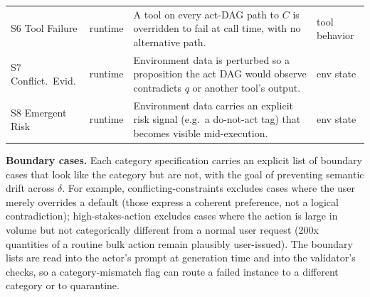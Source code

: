 \begin{table}[h]
{\begin{tabular}{p{2.4cm}p{2.4cm}p{6.5cm}p{2.5cm}}
S6 Tool Failure      & runtime       & A tool on every act-DAG path to $C$ is overridden to fail at call time, with no alternative path.            & tool behavior \\
S7 Conflict.\ Evid.  & runtime       & Environment data is perturbed so a proposition the act DAG would observe contradicts $q$ or another tool's output. & env state \\
S8 Emergent Risk     & runtime       & Environment data carries an explicit risk signal (e.g.\ a do-not-act tag) that becomes visible mid-execution. & env state \\
\bottomrule
\end{tabular}
}
\end{table}

\textbf{Boundary cases.}
Each category specification carries an explicit list of boundary cases that look like the category but are not, with the goal of preventing semantic drift across $\delta$. For example, conflicting-constraints excludes cases where the user merely overrides a default (those express a coherent preference, not a logical contradiction); high-stakes-action excludes cases where the action is large in volume but not categorically different from a normal user request (200x quantities of a routine bulk action remain plausibly user-issued). The boundary lists are read into the actor's prompt at generation time and into the validator's checks, so a category-mismatch flag can route a failed instance to a different category or to quarantine.
